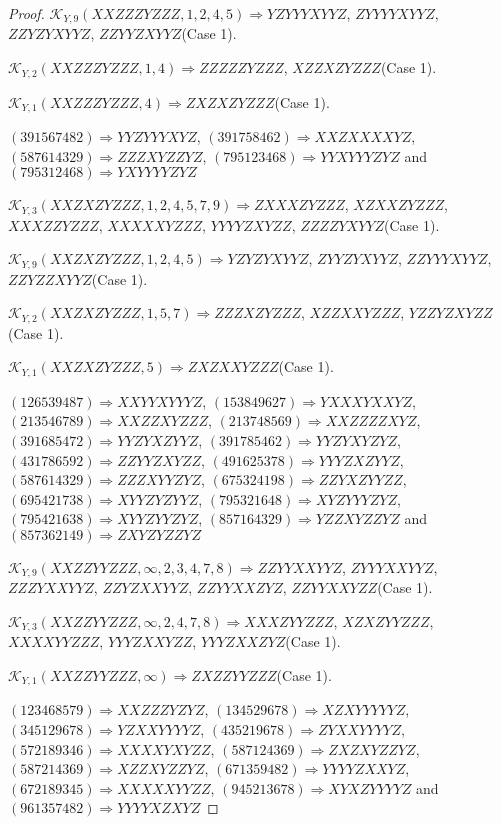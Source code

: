 \documentclass[12pt]{article}
\theoremstyle{plain}
\theoremstyle{definition}
\theoremstyle{remark}
\newcommand{\fancy}[1]{\mathcal{#1}}
\def\K{\fancy{K}}
\begin{document}
\begin{proof}
	$\K_{Y,9}(XXZZZYZZZ,1, 2, 4, 5)\Rightarrow $$YZYYYXYYZ$, $ZYYYYXYYZ$, $ZZYZYXYYZ$, $ZZYYZXYYZ$(Case 1).
	
	$\K_{Y,2}(XXZZZYZZZ,1, 4)\Rightarrow $$ZZZZZYZZZ$, $XZZXZYZZZ$(Case 1).
	
	$\K_{Y,1}(XXZZZYZZZ,4)\Rightarrow $$ZXZXZYZZZ$(Case 1).
	
	
	
	$(3 9 1 5 6 7 4 8 2)\Rightarrow YYZYYYXYZ$, $(3 9 1 7 5 8 4 6 2)\Rightarrow XXZXXXXYZ$, $(5 8 7 6 1 4 3 2 9)\Rightarrow ZZZXYZZYZ$, $(7 9 5 1 2 3 4 6 8)\Rightarrow YYXYYYZYZ$ and $(7 9 5 3 1 2 4 6 8)\Rightarrow YXYYYYZYZ$
	
	
	$\K_{Y,3}(XXZXZYZZZ,1, 2, 4, 5, 7, 9)\Rightarrow $$ZXXXZYZZZ$, $XZXXZYZZZ$, $XXXZZYZZZ$, $XXXXXYZZZ$, $YYYYZXYZZ$, $ZZZZYXYYZ$(Case 1).
	
	$\K_{Y,9}(XXZXZYZZZ,1, 2, 4, 5)\Rightarrow $$YZYZYXYYZ$, $ZYYZYXYYZ$, $ZZYYYXYYZ$, $ZZYZZXYYZ$(Case 1).
	
	$\K_{Y,2}(XXZXZYZZZ,1, 5, 7)\Rightarrow $$ZZZXZYZZZ$, $XZZXXYZZZ$, $YZZYZXYZZ$(Case 1).
	
	$\K_{Y,1}(XXZXZYZZZ,5)\Rightarrow $$ZXZXXYZZZ$(Case 1).
	
	
	
	$(1 2 6 5 3 9 4 8 7)\Rightarrow XXYYXYYYZ$, $(1 5 3 8 4 9 6 2 7)\Rightarrow YXXXYXXYZ$, $(2 1 3 5 4 6 7 8 9)\Rightarrow XXZZXYZZZ$, $(2 1 3 7 4 8 5 6 9)\Rightarrow XXZZZZXYZ$, $(3 9 1 6 8 5 4 7 2)\Rightarrow YYZYXZYYZ$, $(3 9 1 7 8 5 4 6 2)\Rightarrow YYZYXYZYZ$, $(4 3 1 7 8 6 5 9 2)\Rightarrow ZZYYZXYZZ$, $(4 9 1 6 2 5 3 7 8)\Rightarrow YYYZXZYYZ$, $(5 8 7 6 1 4 3 2 9)\Rightarrow ZZZXYYZYZ$, $(6 7 5 3 2 4 1 9 8)\Rightarrow ZZYXZYYZZ$, $(6 9 5 4 2 1 7 3 8)\Rightarrow XYYZYZYYZ$, $(7 9 5 3 2 1 6 4 8)\Rightarrow XYZYYYZYZ$, $(7 9 5 4 2 1 6 3 8)\Rightarrow XYYZYYZYZ$, $(8 5 7 1 6 4 3 2 9)\Rightarrow YZZXYZZYZ$ and $(8 5 7 3 6 2 1 4 9)\Rightarrow ZXYZYZZYZ$
	
	
	$\K_{Y,9}(XXZZYYZZZ,\infty,2, 3, 4, 7, 8)\Rightarrow $$ZZYYXXYYZ$, $ZYYYXXYYZ$, $ZZZYXXYYZ$, $ZZYZXXYYZ$, $ZZYYXXZYZ$, $ZZYYXXYZZ$(Case 1).
	
	$\K_{Y,3}(XXZZYYZZZ,\infty,2, 4, 7, 8)\Rightarrow $$XXXZYYZZZ$, $XZXZYYZZZ$, $XXXXYYZZZ$, $YYYZXXYZZ$, $YYYZXXZYZ$(Case 1).
	
	$\K_{Y,1}(XXZZYYZZZ,\infty)\Rightarrow $$ZXZZYYZZZ$(Case 1).
	
	
	
	$(1 2 3 4 6 8 5 7 9)\Rightarrow XXZZZYZYZ$, $(1 3 4 5 2 9 6 7 8)\Rightarrow XZXYYYYYZ$, $(3 4 5 1 2 9 6 7 8)\Rightarrow YZXXYYYYZ$, $(4 3 5 2 1 9 6 7 8)\Rightarrow ZYXXYYYYZ$, $(5 7 2 1 8 9 3 4 6)\Rightarrow XXXXYXYZZ$, $(5 8 7 1 2 4 3 6 9)\Rightarrow ZXZXYZZYZ$, $(5 8 7 2 1 4 3 6 9)\Rightarrow XZZXYZZYZ$, $(6 7 1 3 5 9 4 8 2)\Rightarrow YYYYZXXYZ$, $(6 7 2 1 8 9 3 4 5)\Rightarrow XXXXXYYZZ$, $(9 4 5 2 1 3 6 7 8)\Rightarrow XYXZYYYYZ$ and $(9 6 1 3 5 7 4 8 2)\Rightarrow YYYYXZXYZ$
	

\end{proof}
\end{document}
